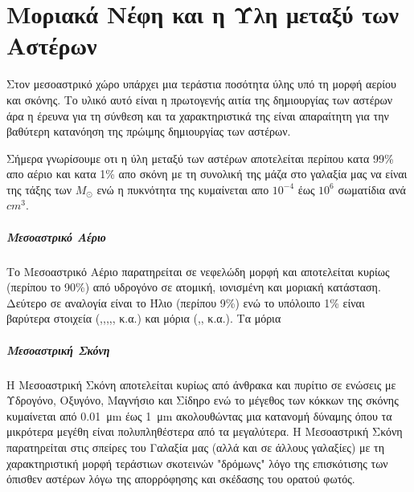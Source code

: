\documentclass[a4paper,11pt]{memoir}
\newcommand{\sm}{$M_{\odot}$}
\begin{document}
\chapter{Μοριακά Νέφη και η Ύλη μεταξύ των Αστέρων}

Στον μεσοαστρικό χώρο υπάρχει μια τεράστια ποσότητα ύλης  υπό τη μορφή αερίου και σκόνης. Το υλικό αυτό είναι η πρωτογενής αιτία  της δημιουργίας των αστέρων άρα η έρευνα για τη σύνθεση και τα χαρακτηριστικά της είναι απαραίτητη για την βαθύτερη κατανόηση της πρώιμης  δημιουργίας των αστέρων.

Σήμερα γνωρίσουμε οτι η ύλη μεταξύ των αστέρων αποτελείται περίπου κατα 99\% απο αέριο και κατα 1\% απο σκόνη με τη συνολική της μάζα στο γαλαξία μας να είναι της τάξης των \sm {} ενώ η πυκνότητα της κυμαίνεται απο $10^{-4}$ έως $10^{6}$ σωματίδια ανά $cm^3$.

\paragraph{Μεσοαστρικό Αέριο} 
Το Μεσοαστρικό Αέριο παρατηρείται σε νεφελώδη μορφή και αποτελείται κυρίως (περίπου το 90\%) από υδρογόνο σε ατομική, ιονισμένη και μοριακή κατάσταση. Δεύτερο σε αναλογία είναι το Ήλιο (περίπου 9\%) ενώ το υπόλοιπο 1\% είναι βαρύτερα στοιχεία (,,,,, κ.α.) και μόρια (,, κ.α.).
Τα μόρια 

\paragraph{Μεσοαστρική Σκόνη}
Η Μεσοαστρική Σκόνη αποτελείται κυρίως από άνθρακα και πυρίτιο σε ενώσεις με Υδρογόνο, Οξυγόνο, Μαγνήσιο και Σίδηρο ενώ το μέγεθος των κόκκων της σκόνης κυμαίνεται από \SI{0.01}{\micro\meter} έως \SI{1}{\micro\meter} ακολουθώντας μια κατανομή δύναμης όπου τα μικρότερα μεγέθη είναι πολυπληθέστερα από τα μεγαλύτερα. 
Η Μεσοαστρική Σκόνη παρατηρείται στις σπείρες του Γαλαξία μας (αλλά και σε άλλους γαλαξίες) με τη χαρακτηριστική μορφή τεράστιων σκοτεινών "δρόμωνς" λόγο της επισκότισης των όπισθεν αστέρων λόγω της απορρόφησης και σκέδασης του ορατού φωτός.
\end{document}
